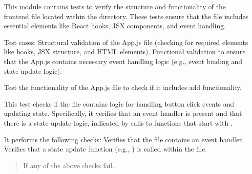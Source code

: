 \documentclass[letterpaper,10pt,english]{sphinxmanual}
\begin{document}
\sphinxAtStartPar
This module contains tests to verify the structure and functionality of the frontend
 file located within the  directory. These tests ensure
that the file includes essential elements like React hooks, JSX components, and event handling.

\sphinxAtStartPar
Test cases:
\sphinxhyphen{} Structural validation of the App.js file (checking for required elements like hooks, JSX structure, and HTML elements).
\sphinxhyphen{} Functional validation to ensure that the App.js contains necessary event handling logic (e.g.,  event binding and state update logic).

\begin{fulllineitems}
\label{\detokenize{test.frontend:test.frontend.test_app.test_app_contains_add_functionality}}
\pysigstartsignatures
\pysiglinewithargsret
{}
{}
{}
\pysigstopsignatures
\sphinxAtStartPar
Test the functionality of the App.js file to check if it includes add functionality.

\sphinxAtStartPar
This test checks if the  file contains logic for handling button click events and
updating state. Specifically, it verifies that an  event handler is present and that
there is a state update logic, indicated by calls to functions that start with .

\sphinxAtStartPar
It performs the following checks:
\sphinxhyphen{} Verifies that the file contains an  event handler.
\sphinxhyphen{} Verifies that a state update function (e.g., ) is called within the file.
\begin{quote}\begin{description}
\sphinxAtStartPar
{} \textendash{} If any of the above checks fail.

\end{description}\end{quote}

\end{fulllineitems}
\end{document}
